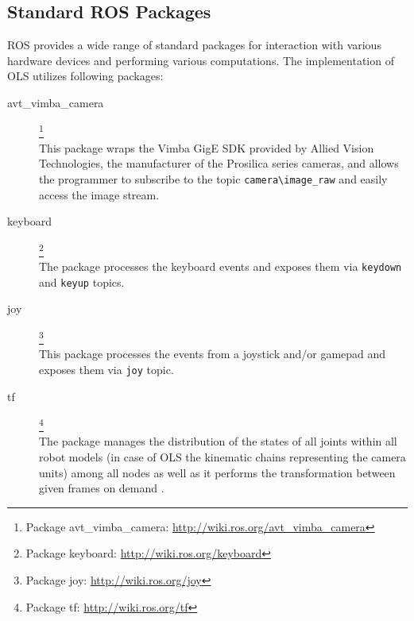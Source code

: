 	
	\subsection{Standard ROS Packages}
	
	ROS provides a wide range of standard packages for interaction with various hardware devices and performing various computations. The implementation of OLS utilizes following packages:
	
	\begin{description}
		\item[avt\_vimba\_camera]\footnote{Package avt\_vimba\_camera: \url{http://wiki.ros.org/avt_vimba_camera}} \hfill \\
		This package wraps the Vimba GigE SDK provided by Allied Vision Technologies, the manufacturer of the Prosilica series cameras, and allows the programmer to subscribe to the topic \texttt{camera\textbackslash image\_raw} and easily access the image stream.
		
		\item[keyboard]\footnote{Package keyboard: \url{http://wiki.ros.org/keyboard}} \hfill \\
		The package processes the keyboard events and exposes them via \texttt{keydown} and \texttt{keyup} topics.
		
		\item[joy]\footnote{Package joy: \url{http://wiki.ros.org/joy}} \hfill \\
		This package processes the events from a joystick and/or gamepad and exposes them via \texttt{joy} topic.
		
		\item[tf]\footnote{Package tf: \url{http://wiki.ros.org/tf}} \hfill \\
		The package manages the distribution of the states of all joints within all robot models (in case of OLS the kinematic chains representing the camera units) among all nodes as well as it performs the transformation between given frames on demand \cite{tf}.
		
	\end{description}
	
	

